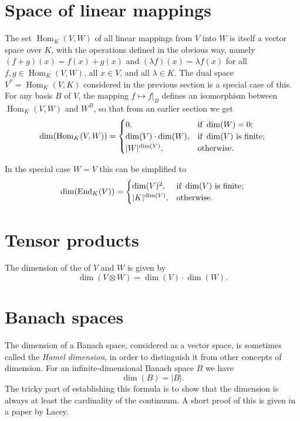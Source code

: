 \documentclass[12pt]{article}
\def\Hom{\operatorname{Hom}}
\def\End{\operatorname{End}}
\begin{document}
\section*{Space of linear mappings}

The set $\Hom_K(V,W)$ of all linear mappings from $V$ into $W$
is itself a vector space over $K$,
with the operations defined in the obvious way,
namely $(f+g)(x)=f(x)+g(x)$ and $(\lambda f)(x)=\lambda f(x)$
for all $f,g\in\Hom_K(V,W)$, all $x\in V$, and all $\lambda\in K$.
The dual space $V^*=\Hom_K(V,K)$ considered in the previous section
is a special case of this.
For any basis $B$ of $V$, the mapping $f\mapsto f|_B$
defines an isomorphism between $\Hom_K(V,W)$ and $W^B$,
so that from an earlier section we get
\[
  \dim(\Hom_K(V,W))=\begin{cases}
               0,&\hbox{if }\dim(W)=0;\\
               \dim(V)\cdot\dim(W),&\hbox{if }\dim(V)\hbox{ is finite};\\
               |W|^{\dim(V)},&\hbox{otherwise}.
            \end{cases}
\]

In the special case $W=V$ this can be simplified to
\[
  \dim(\End_K(V))=\begin{cases}
               \dim(V)^2,&\hbox{if }\dim(V)\hbox{ is finite};\\
               |K|^{\dim(V)},&\hbox{otherwise}.
            \end{cases}
\]

\section*{Tensor products}

The dimension of the  of $V$ and $W$ is given by
\[
  \dim(V\otimes W)=\dim(V)\cdot\dim(W).
\]

\section*{Banach spaces}

The dimension of a Banach space,
considered as a vector space,
is sometimes called the {\it Hamel dimension},
in order to distinguish it from other concepts of dimension.
For an infinite-dimensional Banach space $B$ we have
\[
  \dim(B)=|B|.
\]
The tricky part of establishing this formula
is to show that the dimension is always
at least the cardinality of the continuum.
A short proof of this is given in a paper by Lacey\cite{lacey}.
\end{document}
